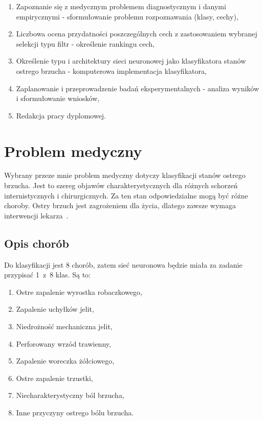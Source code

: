     \begin{enumerate}
        \item Zapoznanie się z medycznym problemem diagnostycznym i danymi empirycznymi - sformułowanie problemu rozpoznawania (klasy, cechy),
        \item Liczbowa ocena przydatności poszczególnych cech z zastosowaniem wybranej selekcji typu filtr - określenie rankingu cech,
        \item Określenie typu i architektury sieci neuronowej jako klasyfikatora stanów ostrego brzucha - komputerowa implementacja klasyfikatora,
        \item Zaplanowanie i przeprowadzenie badań eksperymentalnych - analiza wyników i sformułowanie wniosków,
        \item Redakcja pracy dyplomowej.
    \end{enumerate}

    \chapter{Problem medyczny}\label{ch:problemMedyczny}

    Wybrany przeze mnie problem medyczny dotyczy klasyfikacji stanów ostrego brzucha.
    Jest to szereg objawów charakterystycznych dla różnych schorzeń internistycznych i chirurgicznych.
    Za ten stan odpowiedzialne mogą być różne choroby.
    Ostry brzuch jest zagrożeniem dla życia, dlatego zawsze wymaga interwencji lekarza~\cite{ostry-brzuch}.

    \section{Opis chorób}\label{sec:opisChorób}

    Do klasyfikacji jest 8 chorób, zatem sieć neuronowa będzie miała za zadanie przypisać 1~z~8 klas.
    Są to:
    \begin{enumerate}
        \item Ostre zapalenie wyrostka robaczkowego,
        \item Zapalenie uchyłków jelit,
        \item Niedrożność mechaniczna jelit,
        \item Perforowany wrzód trawienny,
        \item Zapalenie woreczka żółciowego,
        \item Ostre zapalenie trzustki,
        \item Niecharakterystyczny ból brzucha,
        \item Inne przyczyny ostrego bólu brzucha.
    \end{enumerate}

